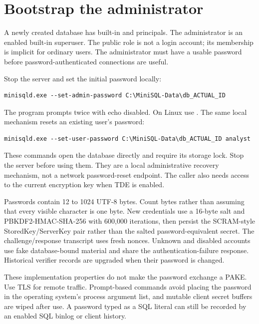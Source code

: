 \section{Bootstrap the administrator}

A newly created database has built-in  and 
principals. The administrator is an enabled built-in superuser. The public
role is not a login account; its membership is implicit for ordinary users.
The administrator must have a usable password before password-authenticated
connections are useful.

Stop the server and set the initial password locally:

\begin{lstlisting}
minisqld.exe --set-admin-password C:\MiniSQL-Data\db_ACTUAL_ID
\end{lstlisting}

The program prompts twice with echo disabled. On Linux use
.
The same local mechanism resets an existing user's password:

\begin{lstlisting}
minisqld.exe --set-user-password C:\MiniSQL-Data\db_ACTUAL_ID analyst
\end{lstlisting}

These commands open the database directly and require its storage lock.
Stop the server before using them. They are a local administrative recovery
mechanism, not a network password-reset endpoint. The caller also needs access
to the current encryption key when TDE is enabled.

Passwords contain 12 to 1024 UTF-8 bytes. Count bytes rather than assuming
that every visible character is one byte. New credentials use a 16-byte salt
and PBKDF2-HMAC-SHA-256 with 600,000 iterations, then persist the SCRAM-style
StoredKey/ServerKey pair rather than the salted password-equivalent secret.
The challenge/response transcript uses fresh nonces. Unknown and disabled
accounts use fake database-bound material and share the authentication-failure
response. Historical verifier records are upgraded when their password is
changed.

These implementation properties do not make the password exchange a PAKE.
Use TLS for remote traffic. Prompt-based commands avoid placing the password
in the operating system's process argument list, and mutable client secret
buffers are wiped after use. A password typed as a SQL literal can still be
recorded by an enabled SQL binlog or client history.

